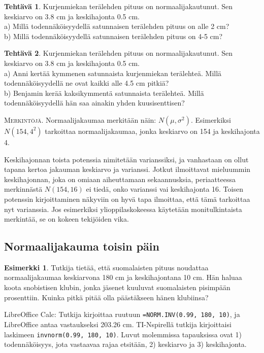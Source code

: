 \documentclass[12pt,leqno,a4paper,oneside]{amsart}
\theoremstyle{definition}
\newtheorem{example}[proclaim]{Esimerkki}
\newtheorem{exercise}{Tehtävä}
\theoremstyle{remark}
\numberwithin{equation}{section}
\begin{document}
\begin{exercise}
 Kurjenmiekan terälehden pituus on normaalijakautunut. Sen keskiarvo on 3.8 cm ja keskihajonta 0.5 cm. \\
 a) Millä todennäköisyydellä satunnaisen terälehden pituus on alle 2 cm?\\
 b) Millä todennäköisyydellä satunnaisen terälehden pituus on 4-5 cm?
\end{exercise}

\begin{exercise}
 Kurjenmiekan terälehden pituus on normaalijakautunut. Sen keskiarvo on 3.8 cm ja keskihajonta 0.5 cm. \\
 a) Anni kertää kymmenen satunnaista kurjenmiekan terälehteä. Millä todennäköisyydellä ne ovat kaikki alle 4.5 cm pitkiä?\\
 b) Benjamin kerää kaksikymmentä satunnaista terälehteä. Millä todennäköisyydellä hän saa ainakin yhden kuusisenttisen?
\end{exercise}

\textsc{Merkintöjä.} Normaalijakaumaa merkitään näin: $N(\mu, \sigma^2)$.
Esimerkiksi $N(154,4^2)$ tarkoittaa normaalijakaumaa, jonka keskiarvo
on 154 ja keskihajonta 4. 

Keskihajonnan toista potenssia nimitetään varianssiksi, ja vanhastaan on ollut tapana kertoa jakauman keskiarvo ja varianssi. 
Jotkut ilmoittavat mieluummin keskihajonnan, joka on omiaan aiheuttamaan sekaannusksia, periaatteessa merkinnästä $N(154, 16)$ ei
tiedä, onko varianssi vai keskihajonta 16. Toisen potenssin kirjoittaminen näkyviin on hyvä tapa ilmoittaa, että tämä tarkoittaa
nyt varianssia. Jos esimerkiksi ylioppilaskokeessa käytetään monitulkintaista merkintää, se on kokeen tekijöiden vika.

\subsection{Normaalijakauma toisin päin}

\begin{example}
 Tutkija tietää, että suomalaisten pituus noudattaa normaalijakaumaa keskiarvona 180 cm ja keskihajontana 10 cm. Hän haluaa koota snobistisen
 klubin, jonka jäsenet kuuluvat suomalaisten pisimpään prosenttiin. Kuinka pitkä pitää olla päästäkseen hänen klubiinsa?
 
 LibreOffice Calc: Tutkija kirjoittaa ruutuun \texttt{=NORM.INV(0.99, 180, 10)}, ja LibreOffice antaa vastaukseksi 203.26 cm.
 TI-Nspirellä tutkija kirjoittaisi laskimeen \texttt{invnorm(0.99, 180, 10)}. Luvut molemmissa tapauksissa ovat 1) todennäköisyys, jota
 vastaavaa rajaa etsitään, 2) keskiarvo ja 3) keskihajonta.
\end{example}
\end{document}
